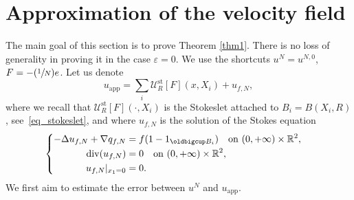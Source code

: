\documentclass[JEP,XML,SOM,Unicode,NoEqCountersInSection,published]{cedram}
\newcommand{\Psfrac}[2]{(\sfrac{#1}{#2})}
\newcommand{\app}{\mathrm{app}}
\newcommand{\st}{\mathrm{st}}
\renewcommand{\div}{\operatorname{div}}
\theoremstyle{plain}
\theoremstyle{definition}
\let\eps\varepsilon
\newcommand{\R}{\mathbb{R}}
\begin{document}
\section{Approximation of the velocity field} \label{sec_approx}

The main goal of this section is to prove Theorem \ref{thm1}. There is no loss of generality in proving it in the case $\eps = 0$. We use the shortcuts $u^N = u^{N,0}$, $F=-\Psfrac{1}{N}e $. Let us denote\vspace*{-3pt}
\[
u_{\app}= \sum_i \mathcal{U}^{\st}_R\left[F\right](x,X_i)+ u_{f,N},
\]
where we recall that $\mathcal{U}^{\st}_R[F](\cdot,X_i)$ is the Stokeslet attached to $B_i=B(X_i,R)$, see~\eqref{eq_stokeslet}, and where $u_{f,N}$ is the solution of the Stokes equation\vspace*{-3pt}
\begin{equation}\label{eq:u_f}
\begin{cases}
\begin{aligned}
-\Delta u_{f,N}+\nabla q_{f,N} &= f (1-1_{\oldbigcup B_i}) \quad\text{on }(0,+\infty)\times \R^2, \\
\div(u_{f,N})&=0 \quad\text{on }(0,+\infty)\times \R^2, \\
u_{f,N}\vert_{x_1=0}&=0.
\end{aligned}
\end{cases}
\end{equation}
We first aim to estimate the error between $u^N$ and
$u_{\app}$.
\end{document}

